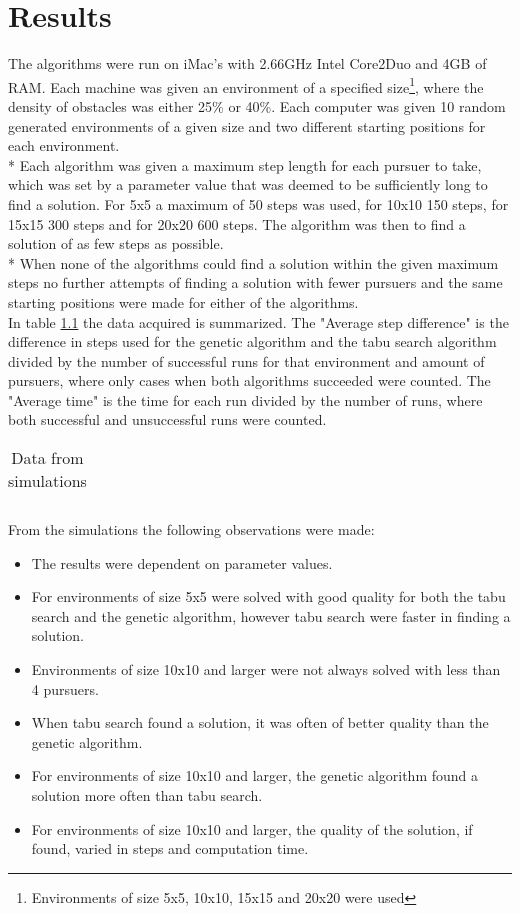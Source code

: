 \chapter{Results}
The algorithms were run on iMac's with 2.66GHz Intel Core2Duo and 4GB of RAM. Each machine was given an environment of a specified size\footnote{Environments of size 5x5, 10x10, 15x15 and 20x20 were used}, where the density of obstacles was either 25\% or 40\%. Each computer was given 10 random generated environments of a given size and two different starting positions for each environment.\\*
Each algorithm was given a maximum step length for each pursuer to take, which was set by a parameter value that was deemed to be sufficiently long to find a solution. For 5x5 a maximum of 50 steps was used, for 10x10 150 steps, for 15x15 300 steps and for 20x20 600 steps. The algorithm was then to find a solution of as few steps as possible.\\*
When none of the algorithms could find a solution within the given maximum steps no further attempts of finding a solution  with fewer pursuers and the same starting positions were made for either of the algorithms.\\
In table \ref{SimData} the data acquired is summarized. The "Average step difference" is the difference in steps used for the genetic algorithm and the tabu search algorithm divided by the number of successful runs for that environment and amount of pursuers, where only cases when both algorithms succeeded were counted. The "Average time" is the time for each run divided by the number of runs, where both successful and unsuccessful runs were counted.
\begin{table}[t!hb]
\begin{tabular}{| c | r | r | r | r | r | r | r | r | }
\hline
 
\hline
\end{tabular}
\caption{Data from simulations}
\label{SimData}
\end{table}
\newpage From the simulations the following observations were made:
\begin{itemize}
\item{The results were dependent on parameter values.}
\item{For environments of size 5x5 were solved with good quality for both the tabu search and the genetic algorithm, however tabu search were faster in finding a solution.}
\item{Environments of size 10x10 and larger were not always solved with less than 4 pursuers.}
\item{When tabu search found a solution, it was often of better quality than the genetic algorithm.}
\item{For environments of size 10x10 and larger, the genetic algorithm found a solution more often than tabu search.}
\item{For environments of size 10x10 and larger, the quality of the solution, if found, varied in steps and computation time.}
\end{itemize}

